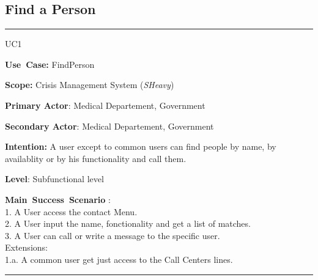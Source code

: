 \subsection{Find a Person}
\vspace{0.5cm}
\hrule
\vspace{0.5cm}
\begin{lyxlist}{UC1}
\small{
\item [\textbf{Use~Case:}] FindPerson
\item [\textbf{Scope:}] Crisis Management System (\emph{SHeavy})
\item [\textbf{Primary Actor}:] Medical Departement, Government
\item [\textbf{Secondary Actor}:] Medical Departement, Government
\item [\textbf{Intention:}]A user except to common users can find people by name, by availablity or by
his functionality and call them.
\item [\textbf{Level}:]Subfunctional level
\item [\textbf{Main~Success~Scenario}]:\\
1. A User access the contact Menu.\\
2. A User input the name, fonctionality and get a list of matches.\\
3. A User can call or write a message to the specific user.\\
Extensions:\\ 
	1.a. A common user get just access to the Call Centers lines.\\

\item 
}
\end{lyxlist}
\hrule 
\vspace{0.5cm} 

